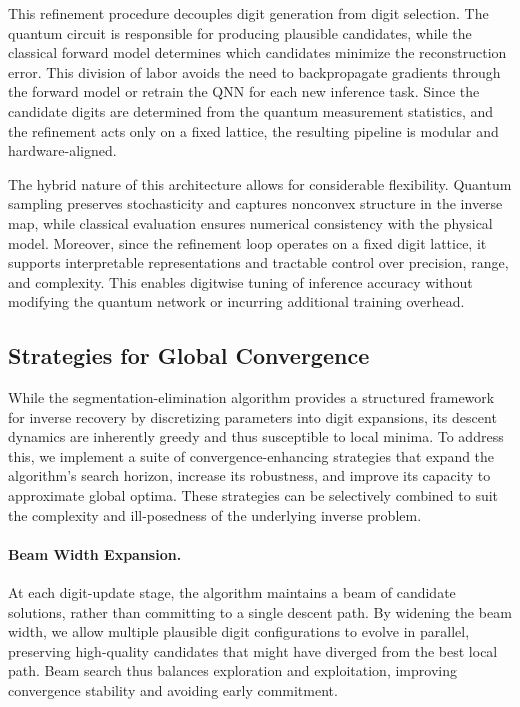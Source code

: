 \documentclass[aps,twocolumn,superscriptaddress,nofootinbib]{revtex4}
\begin{document}
This refinement procedure decouples digit generation from digit selection. The quantum circuit is responsible for producing plausible candidates, while the classical forward model determines which candidates minimize the reconstruction error. This division of labor avoids the need to backpropagate gradients through the forward model or retrain the QNN for each new inference task. Since the candidate digits are determined from the quantum measurement statistics, and the refinement acts only on a fixed lattice, the resulting pipeline is modular and hardware-aligned.

The hybrid nature of this architecture allows for considerable flexibility. Quantum sampling preserves stochasticity and captures nonconvex structure in the inverse map, while classical evaluation ensures numerical consistency with the physical model. Moreover, since the refinement loop operates on a fixed digit lattice, it supports interpretable representations and tractable control over precision, range, and complexity. This enables digitwise tuning of inference accuracy without modifying the quantum network or incurring additional training overhead.
\subsection{Strategies for Global Convergence}

While the segmentation-elimination algorithm provides a structured framework for inverse recovery by discretizing parameters into digit expansions, its descent dynamics are inherently greedy and thus susceptible to local minima. To address this, we implement a suite of convergence-enhancing strategies that expand the algorithm's search horizon, increase its robustness, and improve its capacity to approximate global optima. These strategies can be selectively combined to suit the complexity and ill-posedness of the underlying inverse problem.

\paragraph{Beam Width Expansion.} At each digit-update stage, the algorithm maintains a beam of candidate solutions, rather than committing to a single descent path. By widening the beam width, we allow multiple plausible digit configurations to evolve in parallel, preserving high-quality candidates that might have diverged from the best local path. Beam search thus balances exploration and exploitation, improving convergence stability and avoiding early commitment.
\end{document}
